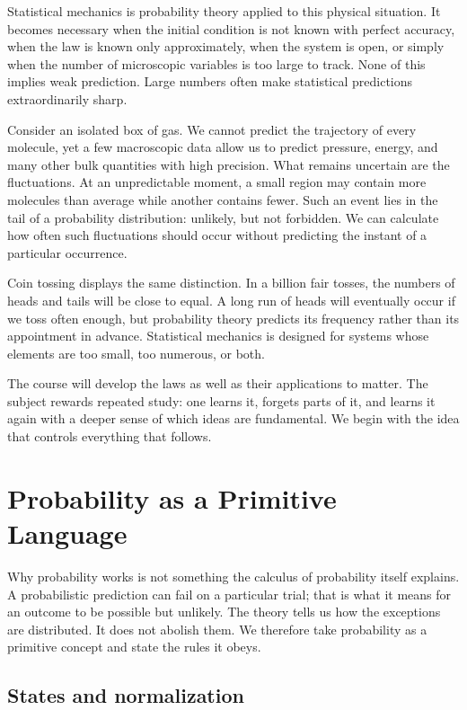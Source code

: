 Statistical mechanics is probability theory applied to this physical
situation. It becomes necessary when the initial condition is not known with
perfect accuracy, when the law is known only approximately, when the system
is open, or simply when the number of microscopic variables is too large to
track. None of this implies weak prediction. Large numbers often make
statistical predictions extraordinarily sharp.

Consider an isolated box of gas. We cannot predict the trajectory of every
molecule, yet a few macroscopic data allow us to predict pressure, energy,
and many other bulk quantities with high precision. What remains uncertain
are the fluctuations. At an unpredictable moment, a small region may contain
more molecules than average while another contains fewer. Such an event lies
in the tail of a probability distribution: unlikely, but not forbidden. We
can calculate how often such fluctuations should occur without predicting
the instant of a particular occurrence.

Coin tossing displays the same distinction. In a billion fair tosses, the
numbers of heads and tails will be close to equal. A long run of heads will
eventually occur if we toss often enough, but probability theory predicts its
frequency rather than its appointment in advance. Statistical mechanics is
designed for systems whose elements are too small, too numerous, or both.

The course will develop the laws as well as their applications to matter.
The subject rewards repeated study: one learns it, forgets parts of it, and
learns it again with a deeper sense of which ideas are fundamental. We begin
with the idea that controls everything that follows.

\section{Probability as a Primitive Language}

Why probability works is not something the calculus of probability itself
explains. A probabilistic prediction can fail on a particular trial; that is
what it means for an outcome to be possible but unlikely. The theory tells us
how the exceptions are distributed. It does not abolish them. We therefore
take probability as a primitive concept and state the rules it obeys.

\subsection{States and normalization}

